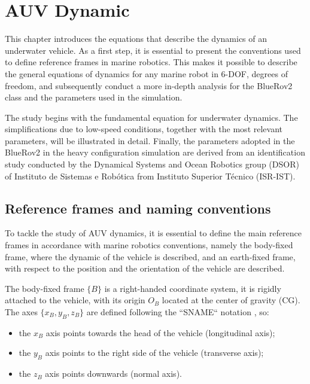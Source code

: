 \chapter{AUV Dynamic}
\label{chap:second}
\ifpdf
    \graphicspath{{Chapter2/Figures/PNG/}{Chapter2/Figures/PDF/}{Chapter2/Figures/}{Chapter2/Figures/EPS/}}
\else
    \graphicspath{{Chapter2/Figures/EPS/}{Chapter2/Figures/}}
\fi
This chapter introduces the equations that describe the dynamics of an underwater vehicle. As a first step, it is essential to present 
the conventions used to define reference frames in marine robotics. This makes it possible to describe the general equations of dynamics 
\cite{fossenHandbookMarineCraft2011} for any marine robot in 6-DOF, degrees of freedom, and subsequently conduct a more in-depth analysis 
for the BlueRov2 class and the parameters used in the simulation.

The study begins with the fundamental equation for underwater dynamics. The simplifications due to low-speed conditions, together with the most relevant 
parameters, will be illustrated in detail.
Finally, the parameters adopted in the BlueRov2 in the heavy configuration simulation are derived from an identification study conducted by the Dynamical Systems and Ocean Robotics group (DSOR) 
of Instituto de Sistemas e Robótica from Instituto Superior Técnico (ISR-IST).

\section{Reference frames and naming conventions}
To tackle the study of AUV dynamics, it is essential to define the main reference frames in accordance with marine robotics conventions, namely 
the body-fixed frame, where the dynamic of the vehicle is described, and an earth-fixed frame, with respect to the position and the orientation 
of the vehicle are described.

The body-fixed frame $\{B\}$ is a right-handed coordinate system, it is rigidly attached to the vehicle, with its origin $O_B$ located at the 
center of gravity (CG). The axes $\{x_B , y_B , z_B\}$ are defined following the ``SNAME`` notation
 \cite{thesocietyofnavalarchitectsandmarineengineerssnameNomenclatureTreatingMotion1950}, so:
 \begin{itemize}
    \item the $x_B$ axis points towards the head of the vehicle (longitudinal axis);
    \item the $y_B$ axis points to the right side of the vehicle (transverse axis);
    \item the $z_B$ axis points downwards (normal axis).
 \end{itemize}

